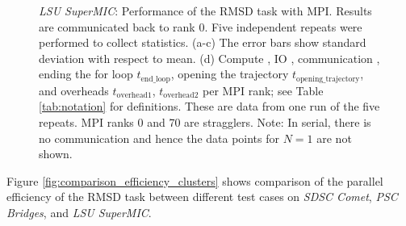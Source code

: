 \begin{figure}[!htb]
\begin{subfigure} {.5\textwidth}
    \label{fig:MPIranks-SuperMIC}
  \end{subfigure}
  \caption{\emph{LSU SuperMIC}: Performance of the RMSD task with MPI.
    Results are communicated back to rank 0.
    Five independent repeats were performed to collect statistics.
    (a-c) The error bars show standard deviation with respect to mean.
    (d) Compute \tcomp, IO \tIO, communication \tcomm, ending the for loop $t_{\text{end\_loop}}$,  opening the trajectory $t_{\text{opening\_trajectory}}$, and overheads $t_{\text{overhead1}}$, $t_{\text{overhead2}}$ per MPI rank; see Table \ref{tab:notation} for definitions.
    These are data from one run of the five repeats.
    MPI ranks 0 and 70 are stragglers.
    Note: In serial, there is no communication and hence the data points for $N=1$ are not shown.}
  \label{fig:MPIwithIO-SuperMIC}
\end{figure} 


Figure \ref{fig:comparison_efficiency_clusters} shows comparison of the parallel efficiency of the RMSD task between different test cases on \emph{SDSC Comet}, \emph{PSC Bridges}, and \emph{LSU SuperMIC}.  

